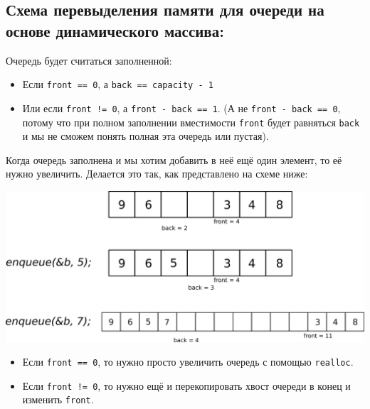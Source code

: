 \documentclass{article}
\begin{document}
\subsection*{Схема перевыделения памяти для очереди на основе динамического массива:}
Очередь будет считаться заполненной: 
\begin{itemize}
\item Если \texttt{front == 0}, а \texttt{back == capacity - 1}
\item Или если \texttt{front != 0}, а \texttt{front - back == 1}. (А не \texttt{front - back == 0}, потому что при полном заполнении вместимости \texttt{front} будет равняться \texttt{back} и мы не сможем понять полная эта очередь или пустая).
\end{itemize}
 Когда очередь заполнена и мы хотим добавить в неё ещё один элемент, то её нужно увеличить. Делается это так, как представлено на схеме ниже:
\begin{center}
\includegraphics[scale=0.8]{../images/queue_dynamic.png}
\end{center}

\begin{itemize}
\item Если \texttt{front == 0}, то нужно просто увеличить очередь с помощью \texttt{realloc}.
\item Если \texttt{front != 0}, то нужно ещё и перекопировать хвост очереди в конец и изменить \texttt{front}.
\end{itemize}
\end{document}

